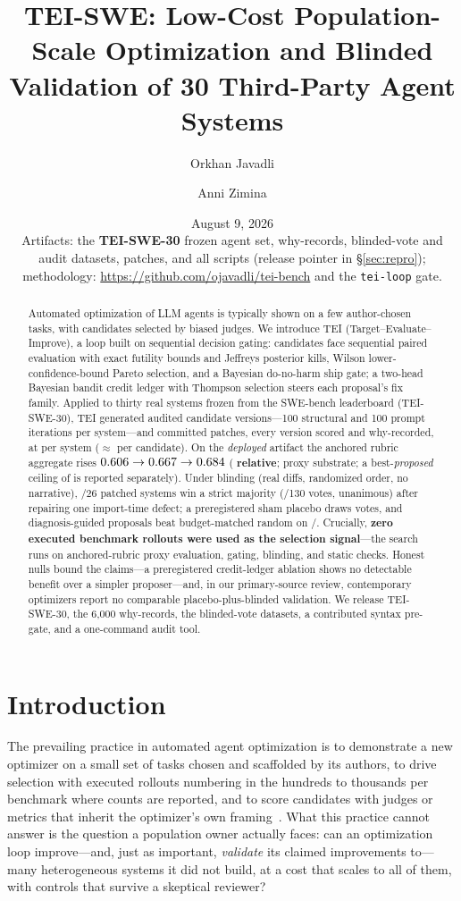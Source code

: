 \documentclass[11pt]{article}
\title{TEI-SWE: Low-Cost Population-Scale Optimization and Blinded Validation
of 30 Third-Party Agent Systems}
\author[1]{Orkhan Javadli}
\author[2]{Anni Zimina}
\affil[1]{Massachusetts Institute of Technology \quad ojavadli@mit.edu}
\affil[2]{Stanford University \quad zimina@stanford.edu}
\date{August 9, 2026\\[2pt]\small Artifacts: the \textbf{TEI-SWE-30} frozen agent set,
\swVersions{} why-records, blinded-vote and audit datasets, patches, and all scripts
(release pointer in \S\ref{sec:repro});\\
\small methodology: \url{https://github.com/ojavadli/tei-bench} and the \texttt{tei-loop} gate.}
\begin{document}
\maketitle

\begin{abstract}
\noindent Automated optimization of LLM agents is typically shown on a few
author-chosen tasks, with candidates selected by biased judges. We introduce
TEI (Target--Evaluate--Improve), a
loop built on sequential decision gating: candidates face sequential paired
evaluation with exact futility bounds and Jeffreys posterior kills, Wilson
lower-confidence-bound Pareto selection, and a Bayesian do-no-harm ship gate; a
two-head Bayesian bandit credit ledger with Thompson selection steers each
proposal's fix family. Applied to thirty real systems frozen from
the SWE-bench leaderboard (TEI-SWE-30), TEI generated \swVersions{} audited
candidate versions---100 structural and 100 prompt iterations per system---and
\swApplied{} committed patches, every version scored and why-recorded, at
\swCostPerAgent{} per system ($\approx$\swCostPerVersion{} per candidate). On the
\emph{deployed} artifact the anchored rubric aggregate rises
$0.606\to0.667\to0.684$ (\textbf{\swAppRelGain{} relative};
proxy substrate; a best-\emph{proposed} ceiling of \swPropRelGain{} is reported
separately). Under blinding (real diffs, randomized order, no
narrative), \swBlindMajP/26 patched systems win a strict majority
(\swBlindVotesP/130 votes, \swBlindPerfect{} unanimous) after repairing one
import-time defect; a preregistered sham placebo draws \swShamReVotes{} votes,
and diagnosis-guided proposals beat budget-matched random on
\swRandTeiWins/\swRandN{}. Crucially, \textbf{zero executed benchmark rollouts
were used as the selection signal}---the search runs on anchored-rubric proxy
evaluation, gating, blinding, and static checks. Honest nulls bound the
claims---a preregistered credit-ledger ablation shows no detectable benefit
over a simpler proposer---and, in our primary-source review, contemporary
optimizers report no comparable placebo-plus-blinded validation. We release
TEI-SWE-30, the 6,000 why-records, the blinded-vote datasets, a contributed
syntax pre-gate, and a one-command audit tool.
\end{abstract}

\section{Introduction}
\label{sec:intro}
The prevailing practice in automated agent optimization is to demonstrate a
new optimizer on a small set of tasks chosen and scaffolded by its authors,
to drive selection with executed rollouts numbering in the hundreds to
thousands per benchmark where counts are reported, and to score candidates
with judges or metrics that inherit the optimizer's own
framing~\citep{gepa2025,mipro2024,maestro2025,ace2026,hivemind2026}. What
this practice cannot answer is the question a population owner actually
faces: can an optimization loop improve---and, just as important,
\emph{validate} its claimed improvements to---many heterogeneous systems it
did not build, at a cost that scales to all of them, with controls that
survive a skeptical reviewer?
\end{document}
